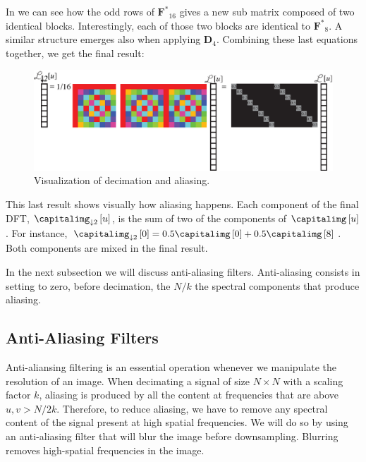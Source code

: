 In \fig{\ref{fig:decimationFT_inmatrixform}} we can see how the odd rows of $\mathbf{F^*}_{16}$ gives a new sub matrix composed of two identical blocks. Interestingly, each of those two blocks are identical to $\mathbf{F^*}_{8}$. A similar structure emerges also when applying $\mathbf{D}_4$. Combining these last equations together, we get the final result:
\begin{figure}[h!]
	\centerline{
		\includegraphics[width=0.9\linewidth]{figures/upsamplig_downsampling/decimation_finalequations_inmatrixform2.eps}
	}
	\caption{Visualization of decimation and aliasing.}
	\label{fig:decimation_finalequations_inmatrixform}
\end{figure}

This last result shows visually how aliasing happens. Each component of the final DFT, $\capitalimg_{\downarrow 2} \left[u\right]$, is the sum of two of the components of $\capitalimg \left[u\right]$. For instance, $\capitalimg_{\downarrow 2} \left[0\right] = 0.5 \capitalimg \left[0\right] + 0.5 \capitalimg \left[8\right]$. Both components are mixed in the final result.

In the next subsection we will discuss anti-aliasing filters. Anti-aliasing consists in setting to zero, before decimation, the $N/k$ the spectral components that produce aliasing.

\subsection{Anti-Aliasing Filters}

Anti-aliansing filtering is an essential operation whenever we manipulate the resolution of an image. When decimating a signal of size $N \times N$ with a scaling factor $k$, aliasing is produced by all the content at frequencies that are above $u,v > N/2k$. Therefore, to reduce aliasing, we have to remove any spectral content of the signal present at high spatial frequencies. We will do so by using an anti-aliasing filter that will blur the image before downsampling. Blurring removes high-spatial frequencies in the image.

